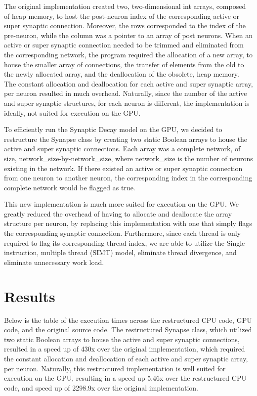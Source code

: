 \documentclass[a4paper]{article}
\begin{document}
The original implementation created two, two-dimensional int arrays, composed of heap memory, to host the post-neuron index of the corresponding active or super synaptic connection. Moreover, the rows corresponded to the index of the pre-neuron, while the column was a pointer to an array of post neurons. When an active or super synaptic connection needed to be trimmed and eliminated from the corresponding network, the program required the allocation of a new array, to house the smaller array of connections, the transfer of elements from the old to the newly allocated array, and the deallocation of the obsolete, heap memory. The constant allocation and deallocation for each active and super synaptic array, per neuron resulted in much overhead. Naturally, since the number of the active and super synaptic structures, for each neuron is different, the implementation is ideally, not suited for execution on the GPU. 

To efficiently run the Synaptic Decay model on the GPU, we decided to restructure the Synapse class by creating two static Boolean arrays to house the active and super synaptic connections. Each array was a complete network, of size, network\_size-by-network\_size, where network\_size is the number of neurons existing in the network. If there existed an active or super synaptic connection from one neuron to another neuron, the corresponding index in the corresponding complete network would be flagged as true. 

This new implementation is much more suited for execution on the GPU. We greatly reduced the overhead of having to allocate and deallocate the array structure per neuron, by replacing this implementation with one that simply flags the corresponding synaptic connection.  Furthermore, since each thread is only required to flag its corresponding thread index, we are able to utilize the Single instruction, multiple thread (SIMT) model, eliminate thread divergence, and eliminate unnecessary work load.


\section{Results}

Below is the table of the execution times across the restructured CPU code, GPU code, and the original source code. The restructured Synapse class, which utilized two static Boolean arrays to house the active and super synaptic connections, resulted in a speed up of 430x over the original implementation, which required the constant allocation and deallocation of each active and super synaptic array, per neuron. Naturally, this restructured implementation is well suited for execution on the GPU, resulting in a speed up 5.46x over the restructured CPU code, and  speed up of 2298.9x over the original implementation.
\end{document}

